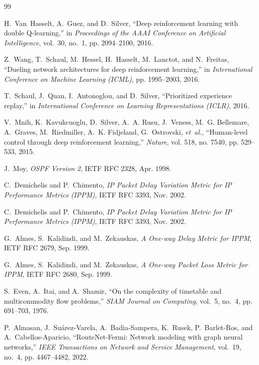 \documentclass[12pt,a4paper,oneside]{report}
\begin{document}
\begin{thebibliography}{99}

H.~Van~Hasselt, A.~Guez, and D.~Silver, ``Deep reinforcement learning with double Q-learning,'' in \emph{Proceedings of the AAAI Conference on Artificial Intelligence}, vol.~30, no.~1, pp. 2094--2100, 2016.

Z.~Wang, T.~Schaul, M.~Hessel, H.~Hasselt, M.~Lanctot, and N.~Freitas, ``Dueling network architectures for deep reinforcement learning,'' in \emph{International Conference on Machine Learning (ICML)}, pp. 1995--2003, 2016.

T.~Schaul, J.~Quan, I.~Antonoglou, and D.~Silver, ``Prioritized experience replay,'' in \emph{International Conference on Learning Representations (ICLR)}, 2016.

V.~Mnih, K.~Kavukcuoglu, D.~Silver, A.~A. Rusu, J.~Veness, M.~G. Bellemare, A.~Graves, M.~Riedmiller, A.~K. Fidjeland, G.~Ostrovski, \emph{et~al.}, ``Human-level control through deep reinforcement learning,'' \emph{Nature}, vol. 518, no. 7540, pp. 529--533, 2015.

J.~Moy, \emph{{OSPF Version 2}}, IETF RFC 2328, Apr. 1998.

C.~Demichelis and P.~Chimento, \emph{{IP Packet Delay Variation Metric for IP Performance Metrics (IPPM)}}, IETF RFC 3393, Nov. 2002.

C.~Demichelis and P.~Chimento, \emph{{IP Packet Delay Variation Metric for IP Performance Metrics (IPPM)}}, IETF RFC 3393, Nov. 2002.

G.~Almes, S.~Kalidindi, and M.~Zekauskas, \emph{{A One-way Delay Metric for IPPM}}, IETF RFC 2679, Sep. 1999.

G.~Almes, S.~Kalidindi, and M.~Zekauskas, \emph{{A One-way Packet Loss Metric for IPPM}}, IETF RFC 2680, Sep. 1999.

S.~Even, A.~Itai, and A.~Shamir, ``On the complexity of timetable and multicommodity flow problems,'' \emph{SIAM Journal on Computing}, vol.~5, no.~4, pp. 691--703, 1976.

P.~Almasan, J.~Su\'{a}rez-Varela, A.~Badia-Sampera, K.~Rusek, P.~Barlet-Ros, and A.~Cabellos-Aparicio, ``RouteNet-Fermi: Network modeling with graph neural networks,'' \emph{IEEE Transactions on Network and Service Management}, vol.~19, no.~4, pp. 4467--4482, 2022.


\end{thebibliography}
\end{document}
